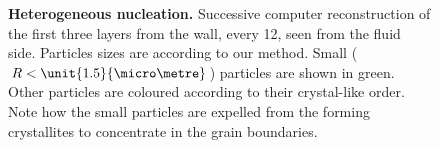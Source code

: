 \documentclass[8.5pt,twoside,twocolumn]{article}
\begin{document}
\begin{figure}
	\caption{\textbf{Heterogeneous nucleation.} Successive computer reconstruction of the first three layers from the wall, every \unit{12}{\hour}, seen from the fluid side. Particles sizes are according to our method. Small ($R<\unit{1.5}{\micro\metre}$) particles are shown in green. Other particles are coloured according to their crystal-like order. Note how the small particles are expelled from the forming crystallites to concentrate in the grain boundaries.}
	\label{fig:small_expelled}
\end{figure}
\end{document}
